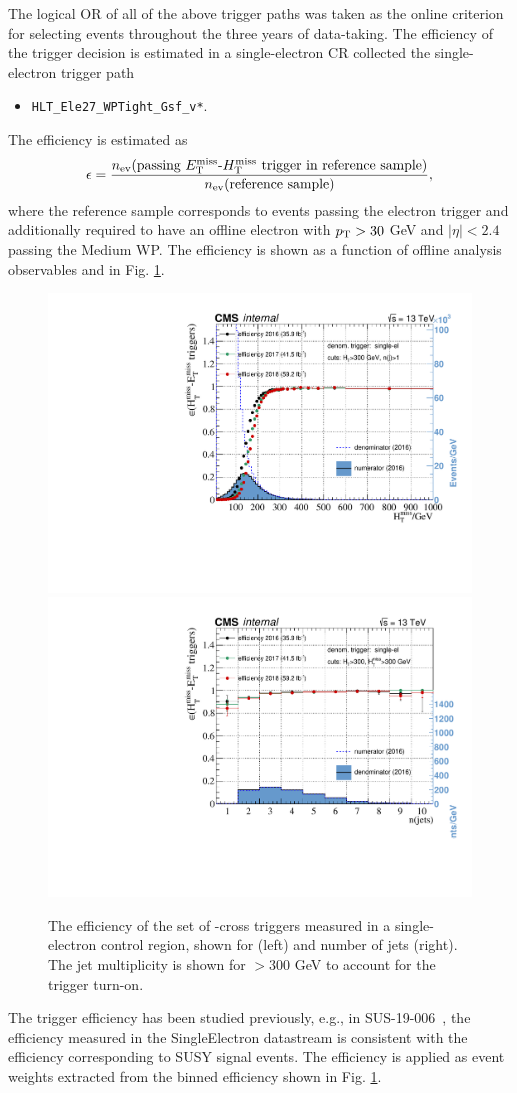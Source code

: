 The logical OR of all of the above trigger paths was taken as the online criterion for selecting events throughout the three years of
data-taking.  The efficiency of the trigger decision is estimated in a single-electron CR collected the single-electron trigger path
\begin{itemize}
\item \texttt{HLT\_Ele27\_WPTight\_Gsf\_v*}.
\end{itemize}
The efficiency is estimated as
\begin{equation}
\epsilon = \frac{ n_{\text{ev}}(\text{passing \MET-\mht trigger in reference sample}) }{n_{\text{ev}}(\text{reference sample})},
\end{equation}
where the reference sample corresponds to events passing the electron trigger and additionally required to have an offline electron with $p_{\mathrm{T}}>30$ GeV and $|\eta|<2.4$ passing the Medium WP. The efficiency is shown as a function of offline analysis observables \mht and \njets in Fig. \ref{fig:main-trigger-real-met}.

\begin{figure}[]
\centering
\includegraphics[width=0.48\linewidth]{plots/trigger/TrigEffMht.pdf}
\includegraphics[width=0.48\linewidth]{plots/trigger/TrigEffNJets.pdf}
\caption{The efficiency of the set of \MET-\mht cross triggers measured in a single-electron control region, shown for \mht (left) and number of jets (right). The jet multiplicity is shown for \mht$>300$ GeV to account for the trigger turn-on.
  }
\label{fig:main-trigger-real-met}
\end{figure}

The trigger efficiency has been studied previously, e.g., in SUS-19-006~\cite{CMS-PAS-SUS-19-006}, the efficiency measured in the SingleElectron datastream is consistent with the efficiency corresponding to SUSY signal events. The efficiency is applied as event weights extracted from the binned efficiency shown in Fig. \ref{fig:main-trigger-real-met}.



